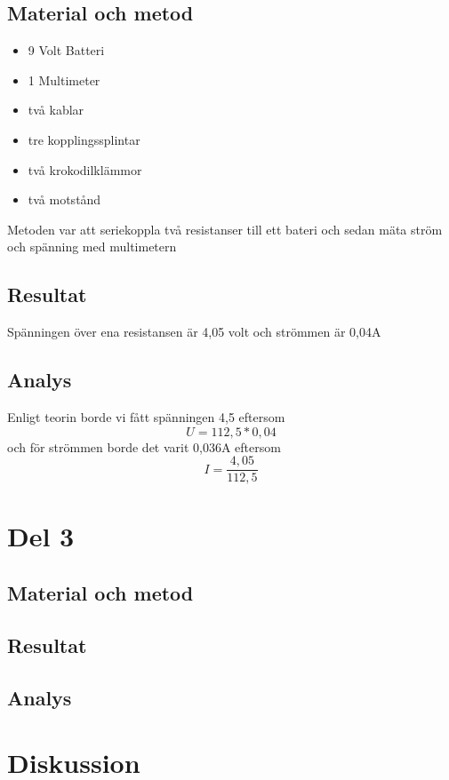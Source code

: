 \documentclass[11p]{article}
\begin{document}
    \subsection{Material och metod}
    \begin{itemize}
        \item 9 Volt Batteri
        \item 1 Multimeter
        \item två kablar
        \item tre kopplingssplintar
        \item två krokodilklämmor
        \item två motstånd
    \end{itemize}

    Metoden var att seriekoppla två resistanser till ett bateri och sedan mäta ström och spänning med multimetern
    \subsection{Resultat}
    Spänningen över ena resistansen är 4,05 volt och strömmen är 0,04A
    \subsection{Analys}
    Enligt teorin borde vi fått spänningen 4,5 eftersom \begin{equation} U = 112,5 * 0,04 \end{equation} och för strömmen borde det varit 0,036A eftersom \begin{equation} I = \frac{4,05}{112,5} \end{equation}
    \section{Del 3}
    \subsection{Material och metod}
    \subsection{Resultat}
    \subsection{Analys}
    \section{Diskussion}
\end{document}
